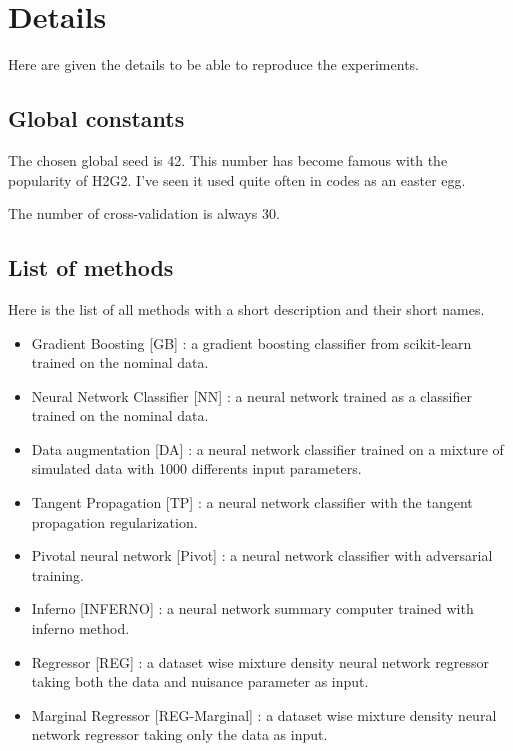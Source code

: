 \section{Details} %
\label{sec:details}

Here are given the details to be able to reproduce the experiments.

\subsection{Global constants} %
\label{sub:global_constants}

The chosen global seed is 42.
This number has become famous with the popularity of H2G2\needcite.
I've seen it used quite often in codes as an easter egg.


The number of cross-validation is always 30.



\subsection{List of methods} %
\label{sub:list_of_methods}


Here is the list of all methods with a short description and their short names.
\begin{itemize}
	\item Gradient Boosting [GB] : a gradient boosting classifier from scikit-learn trained on the nominal data.
	\item Neural Network Classifier [NN] : a neural network trained as a classifier trained on the nominal data.
	\item Data augmentation [DA] : a neural network classifier trained on a mixture of simulated data with 1000 differents input parameters.
	\item Tangent Propagation [TP] : a neural network classifier with the tangent propagation regularization.
	\item Pivotal neural network [Pivot] : a neural network classifier with adversarial training.
	\item Inferno [INFERNO] : a neural network summary computer trained with inferno method.
	\item Regressor [REG] : a dataset wise mixture density neural network regressor taking both the data and nuisance parameter as input.
	\item Marginal Regressor [REG-Marginal] : a dataset wise mixture density neural network regressor taking only the data as input.
\end{itemize}



